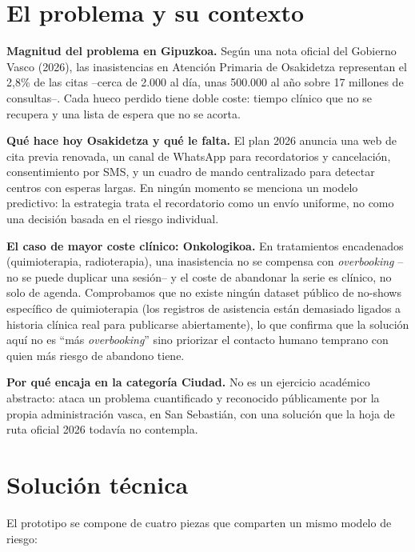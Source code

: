 \documentclass[11pt,a4paper]{article}
\begin{document}
\section{El problema y su contexto}

\textbf{Magnitud del problema en Gipuzkoa.} Según una nota oficial del Gobierno Vasco (2026), las inasistencias en Atención Primaria de Osakidetza representan el 2,8\% de las citas --cerca de 2.000 al día, unas 500.000 al año sobre 17 millones de consultas--. Cada hueco perdido tiene doble coste: tiempo clínico que no se recupera y una lista de espera que no se acorta.

\textbf{Qué hace hoy Osakidetza y qué le falta.} El plan 2026 anuncia una web de cita previa renovada, un canal de WhatsApp para recordatorios y cancelación, consentimiento por SMS, y un cuadro de mando centralizado para detectar centros con esperas largas. En ningún momento se menciona un modelo predictivo: la estrategia trata el recordatorio como un envío uniforme, no como una decisión basada en el riesgo individual.

\textbf{El caso de mayor coste clínico: Onkologikoa.} En tratamientos encadenados (quimioterapia, radioterapia), una inasistencia no se compensa con \textit{overbooking} --no se puede duplicar una sesión-- y el coste de abandonar la serie es clínico, no solo de agenda. Comprobamos que no existe ningún dataset público de no-shows específico de quimioterapia (los registros de asistencia están demasiado ligados a historia clínica real para publicarse abiertamente), lo que confirma que la solución aquí no es ``más \textit{overbooking}'' sino priorizar el contacto humano temprano con quien más riesgo de abandono tiene.

\textbf{Por qué encaja en la categoría Ciudad.} No es un ejercicio académico abstracto: ataca un problema cuantificado y reconocido públicamente por la propia administración vasca, en San Sebastián, con una solución que la hoja de ruta oficial 2026 todavía no contempla.

\section{Solución técnica}

El prototipo se compone de cuatro piezas que comparten un mismo modelo de riesgo:
\end{document}
